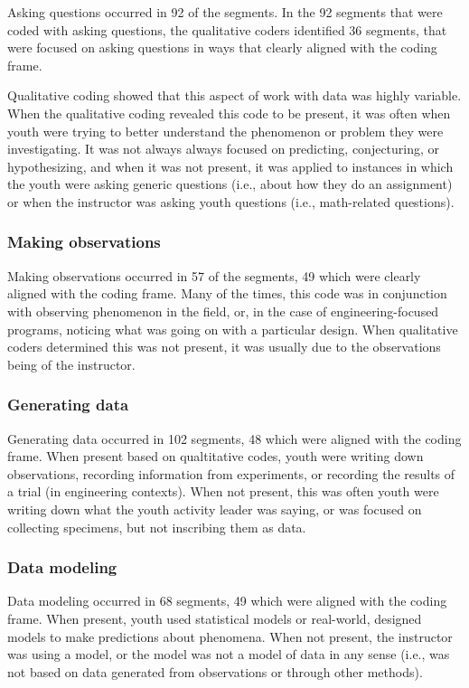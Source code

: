 \documentclass[]{book}
\theoremstyle{definition}
\theoremstyle{definition}
\theoremstyle{definition}
\theoremstyle{remark}
\begin{document}
Asking questions occurred in 92 of the segments. In the 92 segments that
were coded with asking questions, the qualitative coders identified 36
segments, that were focused on asking questions in ways that clearly
aligned with the coding frame.

Qualitative coding showed that this aspect of work with data was highly
variable. When the qualitative coding revealed this code to be present,
it was often when youth were trying to better understand the phenomenon
or problem they were investigating. It was not always always focused on
predicting, conjecturing, or hypothesizing, and when it was not present,
it was applied to instances in which the youth were asking generic
questions (i.e., about how they do an assignment) or when the instructor
was asking youth questions (i.e., math-related questions).

\subsubsection{Making observations}\label{making-observations}

Making observations occurred in 57 of the segments, 49 which were
clearly aligned with the coding frame. Many of the times, this code was
in conjunction with observing phenomenon in the field, or, in the case
of engineering-focused programs, noticing what was going on with a
particular design. When qualitative coders determined this was not
present, it was usually due to the observations being of the instructor.

\subsubsection{Generating data}\label{generating-data}

Generating data occurred in 102 segments, 48 which were aligned with the
coding frame. When present based on qualtitative codes, youth were
writing down observations, recording information from experiments, or
recording the results of a trial (in engineering contexts). When not
present, this was often youth were writing down what the youth activity
leader was saying, or was focused on collecting specimens, but not
inscribing them as data.

\subsubsection{Data modeling}\label{data-modeling}

Data modeling occurred in 68 segments, 49 which were aligned with the
coding frame. When present, youth used statistical models or real-world,
designed models to make predictions about phenomena. When not present,
the instructor was using a model, or the model was not a model of data
in any sense (i.e., was not based on data generated from observations or
through other methods).
\end{document}
